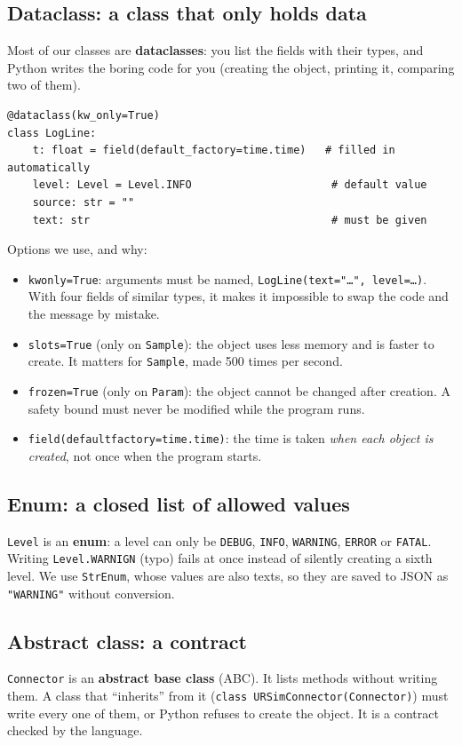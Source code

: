 \documentclass[10pt]{article}
\newcommand{\brkus}{\textunderscore\allowbreak}
\newcommand{\f}[1]{\texttt{\let\_\brkus #1}}
\begin{document}
\subsection{Dataclass: a class that only holds data}
Most of our classes are \textbf{dataclasses}: you list the fields with their types, and Python
writes the boring code for you (creating the object, printing it, comparing two of them).
\begin{lstlisting}
@dataclass(kw_only=True)
class LogLine:
    t: float = field(default_factory=time.time)   # filled in automatically
    level: Level = Level.INFO                      # default value
    source: str = ""
    text: str                                      # must be given
\end{lstlisting}
Options we use, and why:
\begin{itemize}
\item \f{kw\_only=True}: arguments must be named, \f{LogLine(text="\ldots", level=\ldots)}. With
four fields of similar types, it makes it impossible to swap the code and the message by mistake.
\item \f{slots=True} (only on \f{Sample}): the object uses less memory and is faster to create. It
matters for \f{Sample}, made 500 times per second.
\item \f{frozen=True} (only on \f{Param}): the object cannot be changed after creation. A safety
bound must never be modified while the program runs.
\item \f{field(default\_factory=time.time)}: the time is taken \emph{when each object is created},
not once when the program starts.
\end{itemize}

\subsection{Enum: a closed list of allowed values}
\f{Level} is an \textbf{enum}: a level can only be \f{DEBUG}, \f{INFO}, \f{WARNING},
\f{ERROR} or \f{FATAL}. Writing \f{Level.WARNIGN} (typo) fails at once instead of silently
creating a sixth level. We use \f{StrEnum}, whose values are also texts, so they are saved to
JSON as \f{"WARNING"} without conversion.

\subsection{Abstract class: a contract}
\f{Connector} is an \textbf{abstract base class} (ABC). It lists methods without writing them.
A class that ``inherits'' from it (\f{class URSimConnector(Connector)}) must write every one of
them, or Python refuses to create the object. It is a contract checked by the language.
\end{document}
